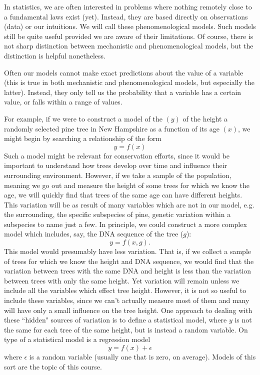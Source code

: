 In statistics, we are often interested in problems where nothing remotely close to a fundamental laws exist (yet). Instead, they are based directly on observations (data) or our intuitions. We will call these {\dfn phenomenological models}. Such models still be quite useful provided we are aware of their limitations. Of course, there is not sharp distinction between mechanistic and phenomenological models, but the distinction is helpful nonetheless. 


Often our models cannot make exact predictions about the value of a variable (this is true in both mechanistic and phenomenological models, but especially the latter). Instead, they only tell us the probability that a variable has a certain value, or falls within a range of values. 

For example, if we were to construct a model of the $(y)$ of the height a randomly selected pine tree in New Hampshire as a function of its age $(x)$, we might begin by searching a relationship of the form
\begin{equation}
y = f(x)
\end{equation}
Such a model might be relevant for conservation efforts, since it would be important to understand how trees develop over time and influence their surrounding environment. 
However, if we take a {\dfn sample} of the population, meaning we go out and measure the height of some trees for which we know the age, we will quickly find that trees of the same age can have different heights.   This variation will be as result of many variables which are not in our model, e.g. the surrounding, the specific subspecies of pine, genetic variation within a subspecies to name just a few. In principle, we could construct a more complex model which includes, say, the DNA sequence of the tree ($g$):
\begin{equation}
y = f(x,g).
\end{equation}
This model would presumably have less variation. That is, if we collect a sample of trees for which we know the height and DNA sequence, we would find that the variation between trees with the same DNA and height is less than the variation between trees with only the same height. Yet variation will remain unless we include all the variables which effect tree height. However, it is not so useful to include these variables, since we can't actually measure most of them and many will have only a small influence on the tree height. One approach to dealing with these ``hidden" sources of variation is to define a {\dfn statistical model}, where $y$ is not the same for each tree of the same height, but is instead a {\dfn random variable}. On type of a statistical model is a regression model
\begin{equation}\label{eq:reg}
y = f(x) + \epsilon
\end{equation}
where $\epsilon$ is a random variable (usually one that is zero, on average). Models of this sort are the topic of this course. 

